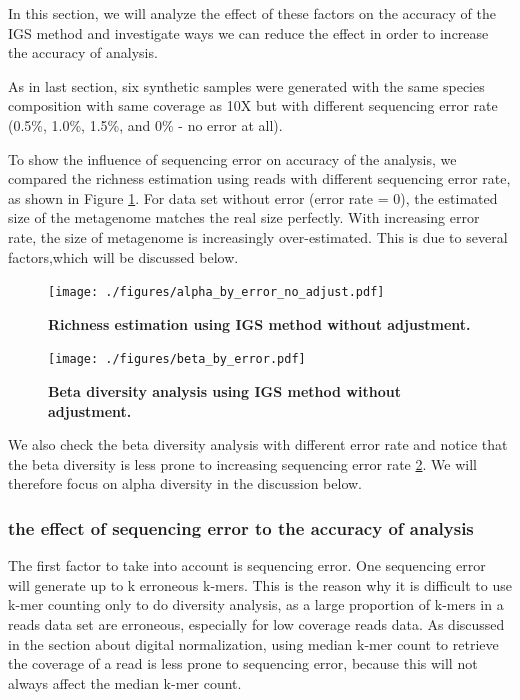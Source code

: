 In this section, we will analyze the effect of these factors on the accuracy of
 the IGS method and investigate ways we can reduce the effect in order to increase the 
accuracy of analysis.

As in last section, six synthetic samples were generated with the same species 
composition with same coverage as 10X but with different sequencing error rate (0.5\%,
 1.0\%, 1.5\%, and 0\% - no error at all).
 
To show the influence of sequencing error on accuracy of the 
analysis, we compared the richness estimation using reads with different 
sequencing error rate, as shown in Figure \ref{fig:IGS_richness_no_adjustment}. 
For data set without error (error rate = 0), the estimated size of the metagenome
matches the real size perfectly. With increasing error rate, the size of metagenome
is increasingly over-estimated. This is due to several factors,which
will be discussed below. 
\begin{figure}[!ht]
 \centerline{\texttt{[image: ./figures/alpha\_by\_error\_no\_adjust.pdf]}}
\caption{\bf Richness estimation using IGS method without adjustment.}
\label{fig:IGS_richness_no_adjustment}
\end{figure}

\begin{figure}[!ht]
 \centerline{\texttt{[image: ./figures/beta\_by\_error.pdf]}}
\caption{\bf Beta diversity analysis using IGS method without adjustment.}
\label{fig:beta_no_adjustment}
\end{figure}

We also check the beta diversity analysis with different error rate and notice
that the beta diversity is less prone to increasing sequencing error rate \ref{fig:beta_no_adjustment}. We 
will therefore focus on alpha diversity in the discussion below.

\subsubsection{the effect of sequencing error to the accuracy of analysis}

The first factor to take into account is sequencing error. One sequencing error
will generate up to k erroneous k-mers. This is the reason why it is difficult to use
k-mer counting only to do diversity analysis, as a large proportion of k-mers
in a reads data set are erroneous, especially for low coverage reads data. As
discussed in the section about digital normalization, using median k-mer count
to retrieve the coverage of a read is less prone to sequencing error, because
this will not always affect the median k-mer count. 


